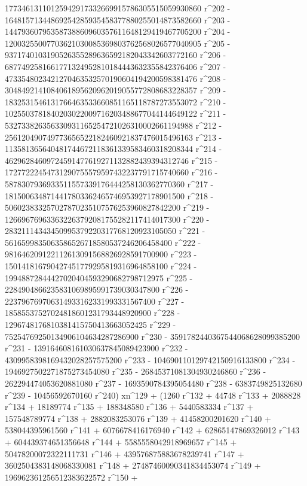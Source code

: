        17734613110125942917332669915786305515059930860 r^202 - 
       16481571344869254285935458377880255014873582660 r^203 - 
       14479360795358738860960357611648129419467705200 r^204 - 
       12003255007703621030085369803762568026577040905 r^205 - 
       9371740103190526355289636592182043342603772160 r^206 - 
       6877492581661771324952810184443632355842376406 r^207 - 
       4733548023421270463532570190604194200598381476 r^208 - 
       3048492141084061895620962019055772808683228357 r^209 - 
       1832531546131766463533660851165118787273553072 r^210 - 
       1025503781840203022009716203488677044144649122 r^211 - 
       532733826356330931165254721026310002661194988 r^212 - 
       256120490749773656522182460921837476015496163 r^213 - 
       113581365640481744672118361339583460318208344 r^214 - 
       46296284609724591477619271132882439394312746 r^215 - 
       17277222454731290755579597432237791715740660 r^216 - 
       5878307936933511557339176444258130362770360 r^217 - 
       1815006348714417803362465746953927178901500 r^218 - 
       506023833257027870235107576253960827842200 r^219 - 
       126696769633632263792081755282117414017300 r^220 - 
       28321114343450995379220317768120923105050 r^221 - 
       5616599835063586526718580537246206458400 r^222 - 
       981646209122112613091568826928591700900 r^223 - 
       150141816790427451779295819316964858100 r^224 - 
       19948872844427020404593290682798712975 r^225 - 
       2284904866235831069895991739030347800 r^226 - 
       223796769706314933162331993331567400 r^227 - 
       18585537527024818601231793448920900 r^228 - 
       1296748176810381415750413663052425 r^229 - 
       75254769250134906104634287286900 r^230 - 
       3591782440367544068628099385200 r^231 - 
       139164608161030637845089423900 r^232 - 
       4309958398169432028257575200 r^233 - 
       104690110129742150916133800 r^234 - 
       1946927502271875273454080 r^235 - 
       26845371081304930246860 r^236 - 262294474053620881080 r^237 - 
       1693590784395054480 r^238 - 6383749825132680 r^239 - 
       10456592670160 r^240) xn^129 + (1260 r^132 + 44748 r^133 + 
       2088828 r^134 + 18189774 r^135 + 188348580 r^136 + 
       5440583334 r^137 + 157548789774 r^138 + 2882083253076 r^139 + 
       41458200201620 r^140 + 538044395961560 r^141 + 
       6076678416176940 r^142 + 62865147869326012 r^143 + 
       604439374651356648 r^144 + 5585558042918969657 r^145 + 
       50478200072322111731 r^146 + 439576875883678239741 r^147 + 
       3602504383148068330081 r^148 + 27487460090341834453074 r^149 + 
       196962361256512383622572 r^150 + 
